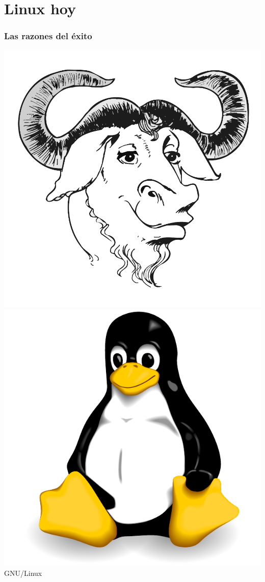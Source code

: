 \documentclass[hyperref={colorlinks}]{beamer}
\begin{document}
\section{Linux hoy}
\begin{frame}
    \frametitle{Las razones del \'exito}
\begin{center}
    \includegraphics[width=.10\textwidth]{figs/gnu.pdf}
    \includegraphics[width=.10\textwidth]{figs/tux.pdf}\\
GNU/Linux
\end{center}


\end{frame}
\end{document}
